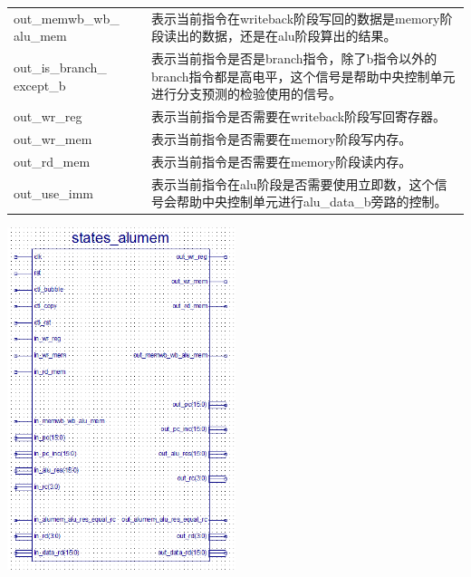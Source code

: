 \begin{center}
\begin{longtable}{p{}p{}}
        out\_memwb\_wb\_  alu\_mem &  表示当前指令在writeback阶段写回的数据是memory阶段读出的数据，还是在alu阶段算出的结果。\\
        out\_is\_branch\_  except\_b &  表示当前指令是否是branch指令，除了b指令以外的branch指令都是高电平，这个信号是帮助中央控制单元进行分支预测的检验使用的信号。\\
        out\_wr\_reg &  表示当前指令是否需要在writeback阶段写回寄存器。\\
        out\_wr\_mem &  表示当前指令是否需要在memory阶段写内存。\\
        out\_rd\_mem &  表示当前指令是否需要在memory阶段读内存。\\
        out\_use\_imm & 表示当前指令在alu阶段是否需要使用立即数，这个信号会帮助中央控制单元进行alu\_data\_b旁路的控制。 \\
        \bottomrule
    \end{longtable}
\end{center}

\begin{center}
    \includegraphics[height=10cm]{image/detail/detail_alumem.png}
    \label{fig:alumem}
\end{center}


